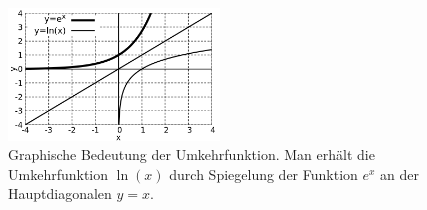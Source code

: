 \begin{figure}
    \centering
    \includegraphics[width=0.5\textwidth]{./gnuplot/inverse-function-reflection}
    \caption{Graphische Bedeutung der Umkehrfunktion. Man erhält die Umkehrfunktion $\ln(x)$ durch Spiegelung der Funktion $e^x$ an der Hauptdiagonalen $y=x$.}
    \label{fig:InvFunRefl}
\end{figure}

